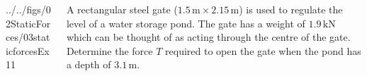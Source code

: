 \documentclass[9pt,xcolor={svgnames, x11names},professionalfonts, mathserif]{beamer}
\begin{document}

\begin{frame}
	
	\begin{columns}
		\begin{column}{0.525\textwidth}
			\begin{mybox}
				\begin{cfig}[0.4]{../../figs/02StaticForces/03staticforcesEx11}\end{cfig}
			\end{mybox}
		\end{column}
		\begin{column}{0.475\textwidth}
			\begin{myexam}{}{}
				\raggedright
				A rectangular steel gate ($1.5\,\text{m}\times2.15\,\text{m}$) is used to regulate the level of a water storage pond. The gate has a weight of $1.9\,\text{kN}$ which can be thought of as acting through the centre of the gate.\parb
				Determine the force $T$ required to open the gate when the pond has a depth of $3.1\,\text{m}$.
			\end{myexam}
		\end{column}
	\end{columns}
	
\end{frame}




\end{document}

